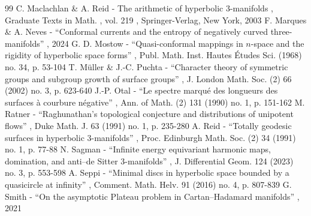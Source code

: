 \documentclass[10pt]{amsart}
\theoremstyle{plain}
\theoremstyle{definition}
\begin{document}
\begin{thebibliography}{99}
 C. Maclachlan \& A. Reid - The arithmetic of hyperbolic $3$-manifolds , Graduate Texts in Math. , vol. 219 , Springer-Verlag, New York, 2003
 F. Marques \& A. Neves - “Conformal currents and the entropy of negatively curved three-manifolds” , 2024
 G. D. Mostow - “Quasi-conformal mappings in $n$-space and the rigidity of hyperbolic space forms” , Publ. Math. Inst. Hautes Études Sci. (1968) no. 34, p. 53-104
 T. Müller \& J.-C. Puchta - “Character theory of symmetric groups and subgroup growth of surface groups” , J. London Math. Soc. (2) 66 (2002) no. 3, p. 623-640
 J.-P. Otal - “Le spectre marqué des longueurs des surfaces à courbure négative” , Ann. of Math. (2) 131 (1990) no. 1, p. 151-162
 M. Ratner - “Raghunathan’s topological conjecture and distributions of unipotent flows” , Duke Math. J. 63 (1991) no. 1, p. 235-280
 A. Reid - “Totally geodesic surfaces in hyperbolic $3$-manifolds” , Proc. Edinburgh Math. Soc. (2) 34 (1991) no. 1, p. 77-88
 N. Sagman - “Infinite energy equivariant harmonic maps, domination, and anti–de Sitter 3-manifolds” , J. Differential Geom. 124 (2023) no. 3, p. 553-598
 A. Seppi - “Minimal discs in hyperbolic space bounded by a quasicircle at infinity” , Comment. Math. Helv. 91 (2016) no. 4, p. 807-839
 G. Smith - “On the asymptotic Plateau problem in Cartan–Hadamard manifolds” , 2021
\end{thebibliography}
\end{document}
